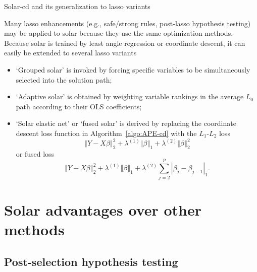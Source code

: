 \documentclass{beamer}
\begin{document}
\begin{frame}{Solar-cd and its generalization to lasso variants}

   Many lasso enhancements (e.g., safe/strong rules, post-lasso hypothesis testing) may be applied to solar because they use the same optimization methods. Because solar is trained by least angle regression or coordinate descent, it can easily be extended to several lasso variants

  \begin{itemize}
    \item `Grouped solar' is invoked by forcing specific variables to be simultaneously selected into the solution path;
    \item `Adaptive solar' is obtained by weighting variable rankings in the average $L_0$ path according to their OLS coefficients;
    \item `Solar elastic net' or `fused solar' is derived by replacing the coordinate descent loss function in Algorithm~\ref{algo:APE-cd} with the $L_1$-$L_2$ loss
      \begin{equation}
        \left\Vert Y -X\beta \right\Vert_2^2 + \lambda^{(1)} \left\Vert \beta \right\Vert_1 + \lambda^{(2)} \left\Vert \beta \right\Vert_2^2
      \end{equation}
      or fused loss
      \begin{equation}
        \left\Vert Y -X\beta \right\Vert_2^2 + \lambda^{(1)} \left\Vert \beta \right\Vert_1 + \lambda^{(2)} \sum_{j=2}^{p} \left\vert \beta_j - \beta_{j-1} \right\vert_1.
      \end{equation}
  \end{itemize}

\end{frame}


\section{Solar advantages over other methods}

\subsection{Post-selection hypothesis testing}
\end{document}

